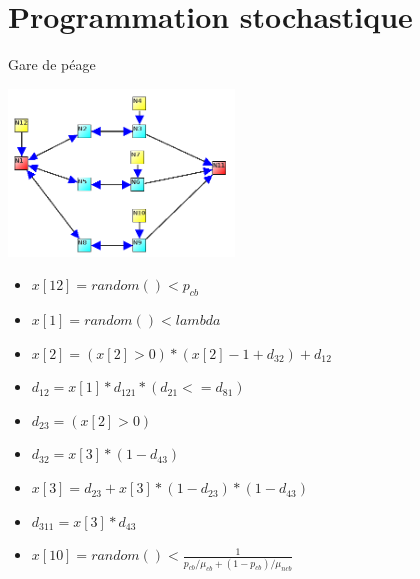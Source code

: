 \documentclass{beamer}
\begin{document}
\section{Programmation stochastique}
  \begin{frame}{Gare de péage}
    \begin{vwcol}[widths={0.6,0.4}, sep=.0cm, rule=0pt] 
      \includegraphics[width=6cm]{../../procstochs/img/3_files.png}

      \tiny
      \begin{itemize}
        \item $x[12] = random() < p_{cb}$
        \item $x[1] = random() < lambda$
        \item $x[2] =(x[2]>0)*(x[2]-1+d_{32})+d_{12}$
        \item $d_{12} = x[1]*d_{121}*(d_{21}<=d_{81})$
        \item $d_{23} = (x[2]>0)$
        \item $d_{32} = x[3]*(1-d_{43})$
        \item $x[3] = d_{23} + x[3]*(1-d_{23})*(1-d_{43})$
        \item $d_{311} = x[3]*d_{43}$
        \item $x[10] = random() < \frac 1 {p_{cb}/\mu_{cb}+(1-p_{cb})/\mu_{ncb}}$
      \end{itemize}
    \end{vwcol}
  \end{frame}
\end{document}
